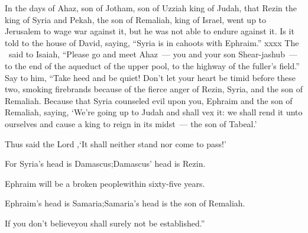 
\begin{inparaenum}
   In the days of Ahaz, son of Jotham, son of Uzziah king of Judah, that Rezin the king of Syria and Pekah, the son of Remaliah, king of Israel, went up to Jerusalem to wage war against it, but he was not able to%
  endure against it.%
   Is it told to the house of David, saying, ``Syria is in cahoots with Ephraim.'' xxxx%
   The \lord\ said to Isaiah, ``Please go and meet Ahaz~--- you and your son Shear-jashub~--- to the end of the aqueduct of the upper pool, to the highway of the fuller's field.''%
   Say to him, ``Take heed and be quiet! Don't let your heart be timid before these two, smoking firebrands because of the fierce anger of Rezin, Syria, and the son of Remaliah.%
   Because that Syria counseled evil upon you, Ephraim and the son of Remaliah, saying,%
   `We're going up to Judah and shall vex it: we shall rend it unto ourselves and cause a king to reign in its midst~--- the son of Tabeal.'\smallskip%
  
  \pa {} Thus said the Lord \god,\pa `It shall neither stand nor come to pass!'%
  
  \pa {} For Syria's head is Damascus;\pa Damascus' head is Rezin.%
  
  \pb Ephraim will be a broken people\pa within sixty-five years.%
  
  \pa {} Ephraim's head is Samaria;\pa Samaria's head is the son of Remaliah.%
  
  \pb If you don't believe\pa you shall surely not be established.''\smallskip%
  

\end{inparaenum}
